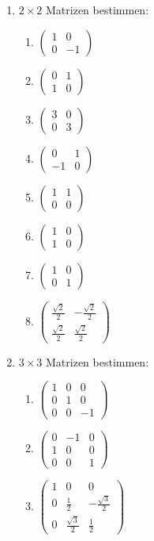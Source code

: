 \begin{enumerate}
    \item \( 2 \times 2 \) Matrizen bestimmen:
    \begin{enumerate}
        \item \( \begin{pmatrix} 1 & 0 \\ 0 & -1 \end{pmatrix} \)
        \item \( \begin{pmatrix} 0 & 1 \\ 1 & 0 \end{pmatrix} \)
        \item \( \begin{pmatrix} 3 & 0 \\ 0 & 3 \end{pmatrix} \)
        \item \( \begin{pmatrix} 0 & 1 \\ -1 & 0 \end{pmatrix} \)
        \item \( \begin{pmatrix} 1 & 1 \\ 0 & 0 \end{pmatrix} \)
        \item \( \begin{pmatrix} 1 & 0 \\ 1 & 0 \end{pmatrix} \)
        \item \( \begin{pmatrix} 1 & 0 \\ 0 & 1 \end{pmatrix} \)
        \item \( \begin{pmatrix} \frac{\sqrt{2}}{2} & -\frac{\sqrt{2}}{2} \\ \frac{\sqrt{2}}{2} & \frac{\sqrt{2}}{2} \end{pmatrix} \)
    \end{enumerate}

    \item \( 3 \times 3 \) Matrizen bestimmen:
    \begin{enumerate}
        \item \( \begin{pmatrix} 1 & 0 & 0 \\ 0 & 1 & 0 \\ 0 & 0 & -1 \end{pmatrix} \)
        \item \( \begin{pmatrix} 0 & -1 & 0 \\ 1 & 0 & 0 \\ 0 & 0 & 1 \end{pmatrix} \)
        \item \( \begin{pmatrix} 1 & 0 & 0 \\ 0 & \frac{1}{2} & -\frac{\sqrt{3}}{2} \\ 0 & \frac{\sqrt{3}}{2} & \frac{1}{2} \end{pmatrix} \)
    \end{enumerate}
\end{enumerate}

